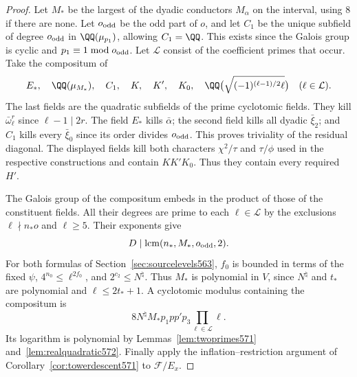 \documentclass[a4paper,11pt]{article}
\theoremstyle{definition}
\theoremstyle{remark}
\numberwithin{equation}{section}
\begin{document}
\begin{proof}
Let \(M_*\) be the largest of the dyadic conductors
\(M_\alpha\) on the interval, using \(8\) if there are
none. Let \(o_{\rm odd}\) be the odd part of \(o\), and let
\(C_1\) be the unique subfield of degree \(o_{\rm odd}\)
in \(\QQ(\mu_{p_1})\), allowing \(C_1=\QQ\). This exists
since the Galois group is cyclic and
\(p_1\equiv1\bmod o_{\rm odd}\). Let \(\mathcal L\) consist
of the coefficient primes that occur. Take the compositum of
\[
 E_*,\quad \QQ(\mu_{M_*}),\quad C_1,\quad K,\quad K',
 \quad K_0,\quad
 \QQ\bigl(\sqrt{(-1)^{(\ell-1)/2}\ell}\bigr)
                                      \quad(\ell\in\mathcal L).
\]
The last fields are the quadratic subfields of the prime
cyclotomic fields. They kill \(\bar\omega_\ell^r\) since
\(\ell-1\mid2r\). The field \(E_*\) kills \(\bar\alpha\);
the second field kills all dyadic \(\bar\xi_2\); and \(C_1\)
kills every \(\bar\xi_0\) since its order divides
\(o_{\rm odd}\). This proves triviality of the residual
diagonal. The displayed fields kill both characters
\(\chi^2/\tau\) and \(\tau/\phi\) used in the respective
constructions and contain \(KK'K_0\). Thus they contain
every required \(H'\).

The Galois group of the compositum embeds in the product
of those of the constituent fields. All their degrees
are prime to each \(\ell\in\mathcal L\) by the exclusions
\(\ell\nmid n_*o\) and \(\ell\ge5\). Their exponents give
\[
        D\mid\operatorname{lcm}(n_*,M_*,o_{\rm odd},2).
\]
For both formulas of Section~\ref{sec:sourcelevels563},
\(f_0\) is bounded in terms of the fixed \(\psi\),
\(4^{n_0}\le\ell^{2f_0}\), and \(2^{c_2}\le N^\natural\).
Thus \(M_*\) is polynomial in \(V\), since \(N^\natural\)
and \(t_*\) are polynomial and \(\ell\le2t_*+1\).
A cyclotomic modulus containing the compositum is
\[
        8N^\natural M_*p_1pp'p_3
                          \prod_{\ell\in\mathcal L}\ell .
\]
Its logarithm is polynomial by Lemmas~\ref{lem:twoprimes571}
and~\ref{lem:realquadratic572}. Finally apply the
inflation--restriction argument of
Corollary~\ref{cor:towerdescent571} to \(\mathcal F/E_x\).
\end{proof}
\end{document}
